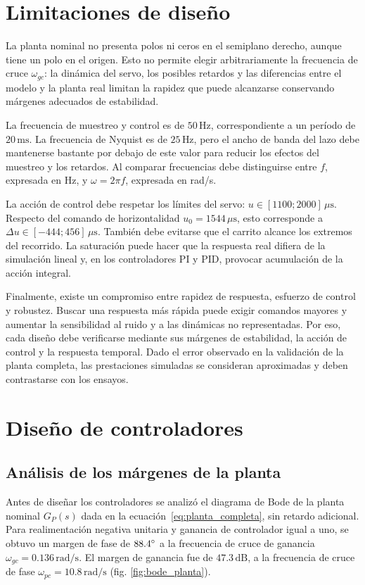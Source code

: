 \documentclass[a4paper, twoside, 10pt, spanish]{article}
\numberwithin{table}{section}
\begin{document}
    \section{Limitaciones de diseño}
    La planta nominal no presenta polos ni ceros en el semiplano
    derecho, aunque tiene un polo en el origen. Esto no permite elegir
    arbitrariamente la frecuencia de cruce $\omega_{gc}$: la dinámica
    del servo, los posibles retardos y las diferencias entre el modelo
    y la planta real limitan la rapidez que puede alcanzarse conservando
    márgenes adecuados de estabilidad.

    La frecuencia de muestreo y control es de $50\,\text{Hz}$, correspondiente a un período de $20\,\text{ms}$. La frecuencia de Nyquist es de $25\,\text{Hz}$, pero el ancho de banda del lazo debe mantenerse bastante por debajo de este valor para reducir los efectos del muestreo y los retardos. Al comparar frecuencias debe distinguirse entre $f$, expresada en Hz, y $\omega=2\pi f$, expresada en rad/s.

    La acción de control debe respetar los límites del servo: $u\in[1100;2000]\,\mu\text{s}$. Respecto del comando de horizontalidad $u_0=1544\,\mu\text{s}$, esto corresponde a $\Delta u\in[-444;456]\,\mu\text{s}$. También debe evitarse que el carrito alcance los extremos del recorrido. La saturación puede hacer que la respuesta real difiera de la simulación lineal y, en los controladores PI y PID, provocar acumulación de la acción integral.

    Finalmente, existe un compromiso entre rapidez de respuesta, esfuerzo de control y robustez. Buscar una respuesta más rápida puede exigir comandos mayores y aumentar la sensibilidad al ruido y a las dinámicas no representadas. Por eso, cada diseño debe verificarse mediante sus márgenes de estabilidad, la acción de control y la respuesta temporal. Dado el error observado en la validación de la planta completa, las prestaciones simuladas se consideran aproximadas y deben contrastarse con los ensayos.

    \section{Diseño de controladores}

    \subsection{Análisis de los márgenes de la planta}
    Antes de diseñar los controladores se analizó el diagrama de Bode de la planta nominal $G_P(s)$ dada en la ecuación~\ref{eq:planta_completa}, sin retardo adicional. Para realimentación negativa unitaria y ganancia de controlador igual a uno, se obtuvo un margen de fase de $88.4\degree$ a la frecuencia de cruce de ganancia $\omega_{gc}=0.136\,\text{rad/s}$. El margen de ganancia fue de $47.3\,\text{dB}$, a la frecuencia de cruce de fase $\omega_{pc}=10.8\,\text{rad/s}$ (fig. \ref{fig:bode_planta}).
\end{document}
